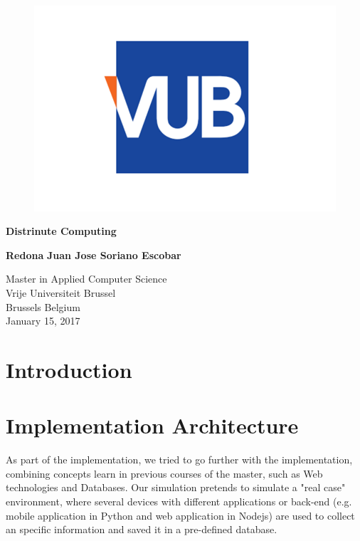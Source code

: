 \documentclass{article}
\begin{document}
    \begin{titlepage}
        \begin{center}
            \vspace*{1cm}
            \begin{figure}
                \centering
                \includegraphics[width=0.5\linewidth]{./img/vub.png}
            \end{figure}
            \Huge
            \textbf{Distrinute Computing}
            
           
            
            \vspace{1.5cm}

            \textbf{Redona}
            \vspace{0.5cm}
            \textbf{Juan Jose Soriano Escobar}
            
            \vfill
            
            
            \Large
            Master in Applied Computer Science\\
            Vrije Universiteit Brussel\\
            Brussels Belgium\\
            January 15, 2017
            
        \end{center}
    \end{titlepage}

    \tableofcontents
    \newpage

    \begin{appendix}
        \listoffigures
      \end{appendix}
      \newpage


        \section{Introduction}
        \section{Implementation Architecture}
        As part of the implementation, we tried to go further with the implementation, combining concepts learn in previous courses of the master, such as Web technologies and Databases.  
        Our simulation pretends to simulate a "real case" environment, where several devices with different applications or back-end (e.g. mobile application in Python and web application in Nodejs)
        are used to collect an specific information and saved it in a pre-defined database.
\end{document}
